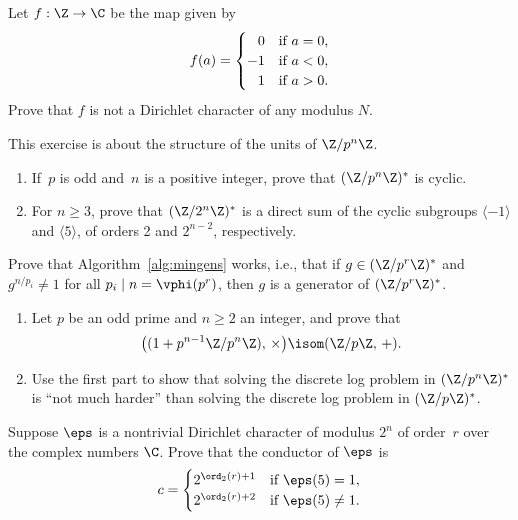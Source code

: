 


\begin{exercises}
\item \label{ex:notdir}
Let $f:\Z\to\C$ be the map given by 
$$
  f(a) = \begin{cases} \hfill 0 & \text{if }a=0,\\
        -1 & \text{if } a <0,\\
        \hfill 1  &\text{if } a > 0.
      \end{cases}
$$      
Prove that $f$ is not a Dirichlet character
of any modulus $N$.
\item\label{ex:cyclic}
This exercise is about the structure of the units of $\Z/p^n\Z$.
\begin{enumerate}
\item If~$p$ is odd and~$n$ is a positive integer,
prove that $(\Z/p^n\Z)^*$  is cyclic.
\item For $n\geq 3$, prove that $(\Z/2^n\Z)^*$ is a direct
sum of the cyclic subgroups $\langle -1 \rangle$
and $\langle 5 \rangle$, of orders 2 and $2^{n-2}$, 
respectively.
\end{enumerate}

\item \label{ex:orderalg}
Prove that Algorithm~\ref{alg:mingens} works, i.e., that 
if $g\in(\Z/p^r\Z)^*$ and $g^{n/p_i}\neq 1$ for all $p_i\mid n=\vphi(p^r)$,
then $g$ is a generator of $(\Z/p^r\Z)^*$.

\item \label{ex:dlogadd}
\begin{enumerate}
\item
Let $p$ be an odd prime and $n\geq 2$ an integer, and prove
that
$$
  \bigl((1+p^{n-1}\Z/p^n\Z),\,\times\bigr) \isom (\Z/p\Z,\,+).
$$
\item
Use the first part to show that solving the discrete log problem
in $(\Z/p^n\Z)^*$ is ``not much harder'' than
solving the discrete log problem in $(\Z/p\Z)^*$.
\end{enumerate}

\item \label{ex:cond2}
Suppose $\eps$ is a nontrivial Dirichlet character of modulus $2^n$
of order~$r$ over the complex numbers $\C$.
Prove that the conductor of $\eps$ is
$$
  c = \begin{cases} 
       2^{\ord_2(r) + 1} & \text{if $\eps(5)=1$},\\
       2^{\ord_2(r) + 2} & \text{if $\eps(5)\neq 1$.}
     \end{cases}
$$


\end{exercises}
